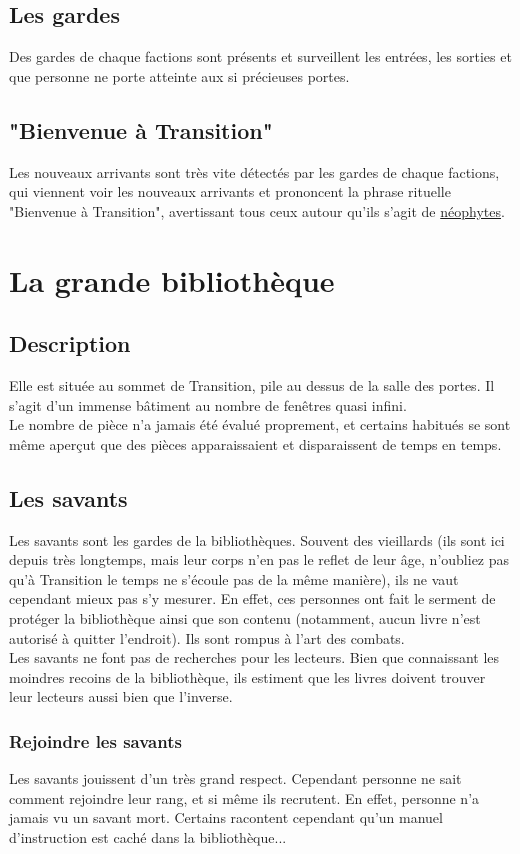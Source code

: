\documentclass{book}
\begin{document}
\subsection{Les gardes}
Des gardes de chaque factions sont présents et surveillent les entrées, les sorties et que personne ne porte atteinte aux si précieuses portes.

\subsection{"Bienvenue à Transition"}
Les nouveaux arrivants sont très vite détectés par les gardes de chaque factions, qui viennent voir les nouveaux arrivants et prononcent la phrase rituelle "Bienvenue à Transition", avertissant tous ceux autour qu'ils s'agit de \hyperlink{neophytes}{néophytes}.

\section{La grande bibliothèque}
\subsection{Description}
Elle est située au sommet de Transition, pile au dessus de la salle des portes. Il s'agit d'un immense bâtiment au nombre de fenêtres quasi infini.\\
Le nombre de pièce n'a jamais été évalué proprement, et certains habitués se sont même aperçut que des pièces apparaissaient et disparaissent de temps en temps.
\subsection{Les savants}
Les savants sont les gardes de la bibliothèques. Souvent des vieillards (ils sont ici depuis très longtemps, mais leur corps n'en pas le reflet de leur âge, n'oubliez pas qu'à Transition le temps ne s'écoule pas de la même manière), ils ne vaut cependant mieux pas s'y mesurer. En effet, ces personnes ont fait le serment de protéger la bibliothèque ainsi que son contenu (notamment, aucun livre n'est autorisé à quitter l'endroit). Ils sont rompus à l'art des combats.
\\
Les savants ne font pas de recherches pour les lecteurs. Bien que connaissant les moindres recoins de la bibliothèque, ils estiment que les livres doivent trouver leur lecteurs aussi bien que l'inverse.
\subsubsection{Rejoindre les savants}
Les savants jouissent d'un très grand respect. Cependant personne ne sait comment rejoindre leur rang, et si même ils recrutent. En effet, personne n'a jamais vu un savant mort. Certains racontent cependant qu'un manuel d'instruction est caché dans la bibliothèque...
\end{document}
